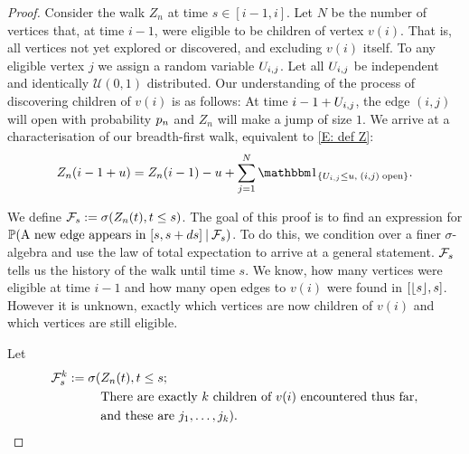 \begin{proof} \label{P: formula an}
	Consider the walk $Z_n$ at time $s\in[i-1, i]$.
	Let $N$ be the number of vertices that, at time $i-1$, were eligible to be children of vertex $v(i)$.
	That is, all vertices not yet explored or discovered, and excluding $v(i)$ itself.
	To any eligible vertex $j$ we assign a random variable $U_{i,j}$.
	Let all $U_{i,j}$ be independent and identically $\mathcal{U}(0,1)$ distributed.
	Our understanding of the process of discovering children of $v(i)$ is as follows:
	At time $i-1+U_{i,j}$, the edge $(i,j)$ will open with probability $p_n$ and
	$Z_n$ will make a jump of size $1$.
	We arrive at a characterisation of our breadth-first walk, 
	equivalent to \eqref{E: def Z}:	
	\begin{equation}
	Z_n(i-1+u) = Z_n(i-1) - u + \sum_{j=1}^{N} \Ind{\{\Uij \leq u, \; (i,j) \; \text{open}\}}.
	\end{equation}
	
	We define $\mathcal{F}_s := \sigma(Z_n(t), t\leq s)$.
	The goal of this proof is to find an expression for
	$\mathbb{P}(\text{A new edge appears in $[s, s+ds]$} \: | \: \mathcal{F}_s)$.
	To do this, we condition over a finer $\sigma$-algebra and use the law of total expectation to arrive at a general statement.
	$\mathcal{F}_s$ tells us the history of the walk until time $s$. 
	We know, how many vertices were eligible at time $i-1$ and how many open edges to $v(i)$ were found in $[\lfloor s\rfloor,s]$.
	However it is unknown, exactly which vertices are now children of $v(i)$ and which vertices are still eligible.
	
	Let 
	\begin{equation}
	\begin{split}
	\mathcal{F}_s^k := \sigma(&Z_n(t), t\leq s; \\
	&\text{There are exactly $k$ children of $v(i)$ encountered thus far}, \\
	&\text{and these are $j_1, \dots, j_k$}).
	\end{split}
	\end{equation}
	

\end{proof}
